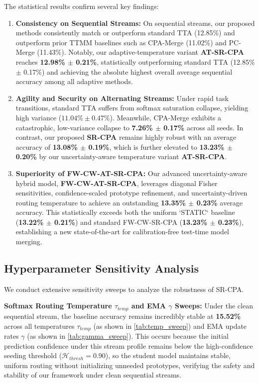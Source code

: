 \documentclass{article}
\theoremstyle{plain}
\theoremstyle{definition}
\theoremstyle{remark}
\begin{document}
The statistical results confirm several key findings:
\begin{enumerate}
    \item \textbf{Consistency on Sequential Streams:} On sequential streams, our proposed methods consistently match or outperform standard TTA (12.85\%) and outperform prior TTMM baselines such as CPA-Merge (11.02\%) and PC-Merge (11.43\%). Notably, our adaptive-temperature variant \textbf{AT-SR-CPA} reaches \textbf{12.98\% $\pm$ 0.21\%}, statistically outperforming standard TTA (12.85\% $\pm$ 0.17\%) and achieving the absolute highest overall average sequential accuracy among all adaptive methods.
    \item \textbf{Agility and Security on Alternating Streams:} Under rapid task transitions, standard TTA suffers from softmax saturation collapse, yielding high variance ($11.04\% \pm 0.47\%$). Meanwhile, CPA-Merge exhibits a catastrophic, low-variance collapse to \textbf{7.26\% $\pm$ 0.17\%} across all seeds. In contrast, our proposed \textbf{SR-CPA} remains highly robust with an average accuracy of \textbf{13.08\% $\pm$ 0.19\%}, which is further elevated to \textbf{13.23\% $\pm$ 0.20\%} by our uncertainty-aware temperature variant \textbf{AT-SR-CPA}.
    \item \textbf{Superiority of FW-CW-AT-SR-CPA:} Our advanced uncertainty-aware hybrid model, \textbf{FW-CW-AT-SR-CPA}, leverages diagonal Fisher sensitivities, confidence-scaled prototype refinement, and uncertainty-driven routing temperature to achieve an outstanding \textbf{13.35\% $\pm$ 0.23\%} average accuracy. This statistically exceeds both the uniform `STATIC` baseline (\textbf{13.22\% $\pm$ 0.21\%}) and standard FW-CW-SR-CPA (\textbf{13.23\% $\pm$ 0.23\%}), establishing a new state-of-the-art for calibration-free test-time model merging.
\end{enumerate}

\subsection{Hyperparameter Sensitivity Analysis}
\label{subsec:sensitivity}

We conduct extensive sensitivity sweeps to analyze the robustness of SR-CPA.

\textbf{Softmax Routing Temperature $\tau_{temp}$ and EMA $\gamma$ Sweeps:} Under the clean sequential stream, the baseline accuracy remains incredibly stable at \textbf{15.52\%} across all temperatures $\tau_{temp}$ (as shown in \cref{tab:temp_sweep}) and EMA update rates $\gamma$ (as shown in \cref{tab:gamma_sweep}). This occurs because the initial prediction confidence under this stream profile remains below the high-confidence seeding threshold ($\mathcal{H}_{thresh} = 0.90$), so the student model maintains stable, uniform routing without initializing unneeded prototypes, verifying the safety and stability of our framework under clean sequential streams.
\end{document}
